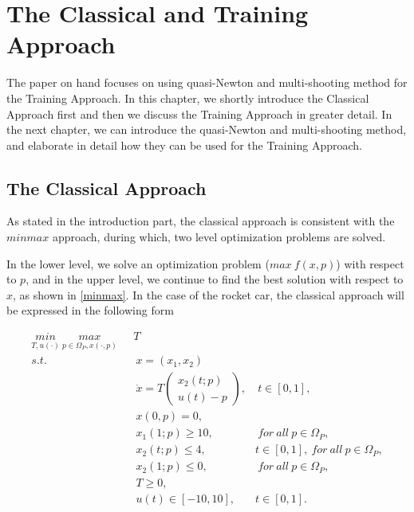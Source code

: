 	
	
	
	
	\chapter{The Classical and Training Approach}
	
	The paper on hand focuses on using quasi-Newton and multi-shooting method for the Training Approach. In this chapter, we shortly introduce the Classical Approach first and then we discuss the Training Approach in greater detail. In the next chapter, we can introduce the quasi-Newton and multi-shooting method, and elaborate in detail how they can be used for the Training Approach. 
	
	
	
	\section{The Classical Approach}
	
	As stated in the introduction part, the classical approach is consistent with the $minmax$ approach, during which, two level optimization problems are solved. 
	
	In the lower level, we solve an optimization problem ($max \  f(x,p)$) with respect to $p$, and in the upper level, we continue to find the best solution with respect to $x$, as shown in \ref{minmax}. In the case of the rocket car, the classical approach will be expressed in the following form
	
	\begin{subequations}
		\begin{align}
			\underset{T, u(\cdot)}{min} \  \underset{ p \in \Omega_P, x(\cdot,p)}{max}  \ \   & \  T \\ 
			s.t.  & \ \ x = (x_1, x_2)   \label{ca_rc_x} \\ 
			& \ \  \dot{x} = T  \begin{pmatrix}  x_2(t;p) \\ u(t)-p   \end{pmatrix}, & \ t \in [0,1],  \label{ca_rc_partial} \\
			& \ \ x(0,p) = 0, \label{ca_rc_t0}\\
			& \ \ x_1(1;p) \geq 10, & \ for \ all \ p \in \Omega_P, \label{ca_rc_x1_t1} \\
			& \ \ x_2(t;p) \leq 4, & t \in [0,1], \ for \ all \ p \in \Omega_P,  \label{ca_rc_x2_tc} \\
			& \ \ x_2(1;p) \leq 0, & \ for \ all \ p \in \Omega_P, \label{ca_rc_x2_t1}  \\
			& \ \ T \geq 0, \\
			& \ \ u(t) \in [-10, 10], & t \in [0,1]. 
		\end{align}
		\label{ca_rc}
	\end{subequations}
	
